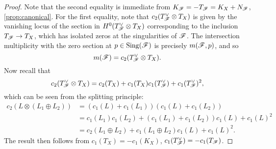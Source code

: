 \begin{proof}
    Note that the second equality is immediate from
    $K_{\mathscr{F}}=-T_{\mathscr{F}}=K_X+N_{\mathscr{F}}$, \cref{prop:canonical}. For the first
    equality, note that $c_2(T_{\mathscr{F}}^\vee\otimes T_X)$ is given by the vanishing
    locus of the section in $H^0(T_{\mathscr{F}}^\vee\otimes T_X)$ corresponding to the
    inclusion $T_{\mathscr{F}}\to T_X$, which has isolated zeros at the singularities of
    $\mathscr{F}$. The intersection multiplicity with the zero section at
    $p\in\operatorname{Sing}(\mathscr{F})$ is precisely $m(\mathscr{F},p)$, and so
    \begin{equation*}
        m(\mathscr{F}) = c_2(T_{\mathscr{F}}^\vee\otimes T_X).
    \end{equation*}
    Now recall that
    \begin{equation*}
        c_2(T_{\mathscr{F}}^\vee\otimes T_X)
            = c_2(T_X) + c_1(T_X)c_1(T_{\mathscr{F}}^\vee) + c_1(T_{\mathscr{F}}^\vee)^2,
    \end{equation*}
    which can be seen from the splitting principle:
    \begin{align*}
        c_2(L\otimes(L_1\oplus L_2))
            &= (c_1(L)+c_1(L_1))(c_1(L)+c_1(L_2)) \\
            &= c_1(L_1)c_1(L_2) + (c_1(L_1)+c_1(L_2))c_1(L) + c_1(L)^2 \\
            &= c_2(L_1\oplus L_2) + c_1(L_1\oplus L_2)c_1(L) + c_1(L)^2.
    \end{align*}
    The result then follows from $c_1(T_X)=-c_1(K_X)$,
    $c_1(T_{\mathscr{F}}^\vee)=-c_1(T_{\mathscr{F}})$.
\end{proof}

